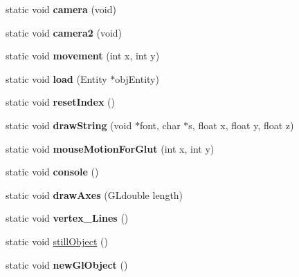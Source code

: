\begin{DoxyCompactItemize}
\item 
static void {\bfseries camera} (void)\hypertarget{classglDisplay_a5a29575275eaa75ffb49853bcab5f03a}{}\label{classglDisplay_a5a29575275eaa75ffb49853bcab5f03a}

\item 
static void {\bfseries camera2} (void)\hypertarget{classglDisplay_af7d36473eeb8178fc4b53a78f2c5ffe5}{}\label{classglDisplay_af7d36473eeb8178fc4b53a78f2c5ffe5}

\item 
static void {\bfseries movement} (int x, int y)\hypertarget{classglDisplay_ac07168618052235eb1d5c8960863a435}{}\label{classglDisplay_ac07168618052235eb1d5c8960863a435}

\item 
static void {\bfseries load} (Entity $\ast$obj\+Entity)\hypertarget{classglDisplay_a9f11005575158c66d17a05f8b3770461}{}\label{classglDisplay_a9f11005575158c66d17a05f8b3770461}

\item 
static void {\bfseries reset\+Index} ()\hypertarget{classglDisplay_a9c33d19c7d89d105c273a1056b218a2b}{}\label{classglDisplay_a9c33d19c7d89d105c273a1056b218a2b}

\item 
static void {\bfseries draw\+String} (void $\ast$font, char $\ast$s, float x, float y, float z)\hypertarget{classglDisplay_a24f2a323b60efcaca8055f431764728c}{}\label{classglDisplay_a24f2a323b60efcaca8055f431764728c}

\item 
static void {\bfseries mouse\+Motion\+For\+Glut} (int x, int y)\hypertarget{classglDisplay_a68e7c99dd75a918038b7fd6be071523f}{}\label{classglDisplay_a68e7c99dd75a918038b7fd6be071523f}

\item 
static void {\bfseries console} ()\hypertarget{classglDisplay_a7749f0d2500597c1fd6484fa87589d09}{}\label{classglDisplay_a7749f0d2500597c1fd6484fa87589d09}

\item 
static void {\bfseries draw\+Axes} (G\+Ldouble length)\hypertarget{classglDisplay_af9a499f1447a9af4d204f976720344bf}{}\label{classglDisplay_af9a499f1447a9af4d204f976720344bf}

\item 
static void {\bfseries vertex\+\_\+\+Lines} ()\hypertarget{classglDisplay_afdcf572d89d262e32f639d4a0fc4c285}{}\label{classglDisplay_afdcf572d89d262e32f639d4a0fc4c285}

\item 
static void \hyperlink{classglDisplay_a948267f8fe5a86e553fcf8c8731ded7f}{still\+Object} ()
\item 
static void {\bfseries new\+Gl\+Object} ()\hypertarget{classglDisplay_ad983bb82a76ee9ef873fbe617796ef6e}{}\label{classglDisplay_ad983bb82a76ee9ef873fbe617796ef6e}


\end{DoxyCompactItemize}
